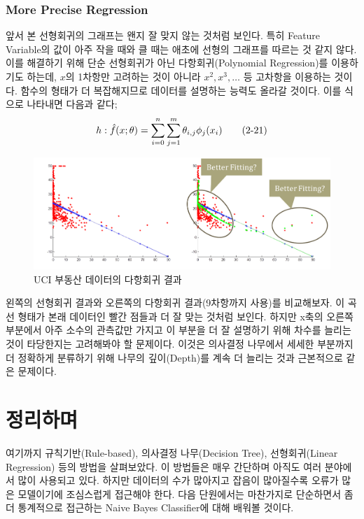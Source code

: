 \documentclass[a4paper]{oblivoir}
\begin{document}
\subsubsection{More Precise Regression}
앞서 본 선형회귀의 그래프는 왠지 잘 맞지 않는 것처럼 보인다. 특히 Feature Variable의 값이 아주 작을 때와 클 때는 애초에 선형의 그래프를 따르는 것 같지 않다. 이를 해결하기 위해 단순 선형회귀가 아닌 다항회귀(Polynomial Regression)를 이용하기도 하는데, $x$의 1차항만 고려하는 것이 아니라 $x^{2}, x^{3}, \hdots$ 등 고차항을 이용하는 것이다. 함수의 형태가 더 복잡해지므로 데이터를 설명하는 능력도 올라갈 것이다. 이를 식으로 나타내면 다음과 같다;
\begin{equation} 
h: \hat{f}(x;\theta)=\sum_{i=0}^{n}\sum_{j=1}^{m}\theta_{i,j}\phi_{j}(x_{i}) 				\tag{2-21}\\
\end{equation}
\begin{figure}[ht]
\centering
\includegraphics[scale=0.6]{Linear_Regression2.png}
\caption{UCI 부동산 데이터의 다항회귀 결과}
\label{Figure 2-19}
\end{figure}

\indent 왼쪽의 선형회귀 결과와 오른쪽의 다항회귀 결과(9차항까지 사용)를 비교해보자. 이 곡선 형태가 본래 데이터인 빨간 점들과 더 잘 맞는 것처럼 보인다. 하지만 x축의 오른쪽 부분에서 아주 소수의 관측값만 가지고 이 부분을 더 잘 설명하기 위해 차수를 늘리는 것이 타당한지는 고려해봐야 할 문제이다. 이것은 의사결정 나무에서 세세한 부분까지 더 정확하게 분류하기 위해 나무의 깊이(Depth)를 계속 더 늘리는 것과 근본적으로 같은 문제이다.

\section*{정리하며}
여기까지 규칙기반(Rule-based), 의사결정 나무(Decision Tree), 선형회귀(Linear Regression) 등의 방법을 살펴보았다. 이 방법들은 매우 간단하며 아직도 여러 분야에서 많이 사용되고 있다. 하지만 데이터의 수가 많아지고 잡음이 많아질수록 오류가 많은 모델이기에 조심스럽게 접근해야 한다. 다음 단원에서는 마찬가지로 단순하면서 좀 더 통계적으로 접근하는 Naive Bayes Classifier에 대해 배워볼 것이다.
\end{document}

